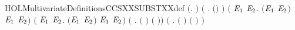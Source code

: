 \begin{SaveVerbatim}{HOLMultivariateDefinitionsCCSXXSUBSTXXdef}
\HOLTokenTurnstile{} \ensuremath{(}\HOLSymConst{\HOLTokenForall{}}.    \HOLSymConst{\ensuremath{=}} \ensuremath{)} \HOLSymConst{\HOLTokenConj{}}
   \ensuremath{(}\HOLSymConst{\HOLTokenForall{}}  .   \ensuremath{(}\HOLSymConst{\ensuremath{\ldotp}}\ensuremath{)} \HOLSymConst{\ensuremath{=}} \HOLSymConst{\ensuremath{\ldotp}}  \ensuremath{)} \HOLSymConst{\HOLTokenConj{}}
   \ensuremath{(}\HOLSymConst{\HOLTokenForall{}} \ensuremath{\HOLBoundVar{E}\sb{\mathrm{1}}} \ensuremath{\HOLBoundVar{E}\sb{\mathrm{2}}}.
          \ensuremath{(}\ensuremath{\HOLBoundVar{E}\sb{\mathrm{1}}} \HOLSymConst{\ensuremath{+}} \ensuremath{\HOLBoundVar{E}\sb{\mathrm{2}}}\ensuremath{)} \HOLSymConst{\ensuremath{=}}
          \ensuremath{\HOLBoundVar{E}\sb{\mathrm{1}}} \HOLSymConst{\ensuremath{+}}   \ensuremath{\HOLBoundVar{E}\sb{\mathrm{2}}}\ensuremath{)} \HOLSymConst{\HOLTokenConj{}}
   \ensuremath{(}\HOLSymConst{\HOLTokenForall{}} \ensuremath{\HOLBoundVar{E}\sb{\mathrm{1}}} \ensuremath{\HOLBoundVar{E}\sb{\mathrm{2}}}.
          \ensuremath{(}\ensuremath{\HOLBoundVar{E}\sb{\mathrm{1}}} \HOLSymConst{\ensuremath{\mid}} \ensuremath{\HOLBoundVar{E}\sb{\mathrm{2}}}\ensuremath{)} \HOLSymConst{\ensuremath{=}}
          \ensuremath{\HOLBoundVar{E}\sb{\mathrm{1}}} \HOLSymConst{\ensuremath{\mid}}   \ensuremath{\HOLBoundVar{E}\sb{\mathrm{2}}}\ensuremath{)} \HOLSymConst{\HOLTokenConj{}}
   \ensuremath{(}\HOLSymConst{\HOLTokenForall{}}  .   \ensuremath{(}  \ensuremath{)} \HOLSymConst{\ensuremath{=}}   \ensuremath{(}  \ensuremath{)}\ensuremath{)} \HOLSymConst{\HOLTokenConj{}}
   \ensuremath{(}\HOLSymConst{\HOLTokenForall{}}  .
          \ensuremath{(}  \ensuremath{)} \HOLSymConst{\ensuremath{=}}  \ensuremath{(}  \ensuremath{)} \ensuremath{)} \HOLSymConst{\HOLTokenConj{}}

\end{SaveVerbatim}
